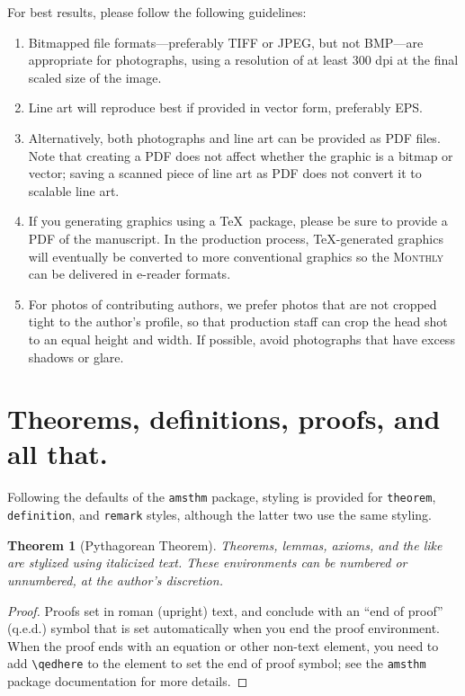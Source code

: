 \documentclass{article}
\theoremstyle{theorem}
\newtheorem{theorem}{Theorem}
\theoremstyle{definition}
\begin{document}
For best results, please follow the following guidelines:
\begin{enumerate}
\item Bitmapped file formats---preferably TIFF or JPEG, but not BMP---are appropriate for photographs, using a resolution of at least 300 dpi at the final scaled size of the image.
\item Line art will reproduce best if provided in vector form, preferably EPS.
\item Alternatively, both photographs and line art can be provided as PDF files.  Note that creating a PDF does not affect whether the graphic is a bitmap or vector; saving a scanned piece of line art as PDF does not convert it to scalable line art.
\item If you generating graphics using a \TeX\ package, please be sure to provide a PDF of the manuscript.  In the production process, \TeX-generated graphics will eventually be converted to more conventional graphics so the \textsc{Monthly} can be delivered in e-reader formats.
\item For photos of contributing authors, we prefer photos that are not cropped tight to the author's profile, so that production staff can crop the head shot to an equal height and width.  If possible, avoid photographs that have excess shadows or glare.
\end{enumerate}

\section*{Theorems, definitions, proofs, and all that.}

Following the defaults of the \texttt{amsthm} package, styling is provided for \texttt{theorem}, \texttt{definition}, and \texttt{remark} styles, although the latter two use the same styling.

\begin{theorem}[Pythagorean Theorem]
Theorems, lemmas, axioms, and the like are stylized using italicized text. These environments can be numbered or unnumbered, at the author's discretion.
\end{theorem}

\begin{proof}
Proofs set in roman (upright) text, and conclude with an ``end of proof'' (q.e.d.) symbol that is set automatically when you end the proof environment.  When the proof ends with an equation or other non-text element, you need to add \verb~\qedhere~ to the element to set the end of proof symbol; see the \texttt{amsthm} package documentation for more details.
\end{proof}
\end{document}
